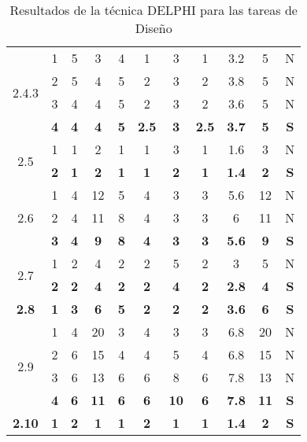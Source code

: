 \documentclass[11pt,a4paper,spanish,twoside]{report}
\begin{document}
\begin{table}[!h]
\begin{tabular}{|c|c||c|c|c|c|c||c|c|c||c|}
    \multirow{4}{*}{2.4.3}& 1 & 5 & 3 & 4 & 1 & 3 & 1 & 3.2 & 5 & N \\
    & 2 & 5 & 4 & 5 & 2 & 3 & 2 & 3.8 & 5 & N \\
    & 3 & 4 & 4 & 5 & 2 & 3 & 2 & 3.6 & 5 & N \\
    & \textbf{4} & \textbf{4} & \textbf{4} & \textbf{5} & \textbf{2.5} & \textbf{3} & \textbf{2.5} & \textbf{3.7} & \textbf{5} & \textbf{S} \\
    \hline

    \multirow{2}{*}{2.5}& 1 & 1 & 2 & 1 & 1 & 3 & 1 & 1.6 & 3 & N \\
    & \textbf{2} & \textbf{1} & \textbf{2} & \textbf{1} & \textbf{1} & \textbf{2} & \textbf{1} & \textbf{1.4} & \textbf{2} & \textbf{S} \\
    \hline

    \multirow{3}{*}{2.6}& 1 & 4 & 12 & 5 & 4 & 3 & 3 & 5.6 & 12 & N \\
    & 2 & 4 & 11 & 8 & 4 & 3 & 3 & 6 & 11 & N \\
    & \textbf{3} & \textbf{4} & \textbf{9} & \textbf{8} & \textbf{4} & \textbf{3} & \textbf{3} & \textbf{5.6} & \textbf{9} & \textbf{S} \\
    \hline

    \multirow{2}{*}{2.7}& 1 & 2 & 4 & 2 & 2 & 5 & 2 & 3 & 5 & N \\
    & \textbf{2} & \textbf{2} & \textbf{4} & \textbf{2} & \textbf{2} & \textbf{4} & \textbf{2} & \textbf{2.8} & \textbf{4} & \textbf{S} \\
    \hline

    \textbf{2.8} & \textbf{1} & \textbf{3} & \textbf{6} & \textbf{5} & \textbf{2} & \textbf{2} & \textbf{2} & \textbf{3.6} & \textbf{6} & \textbf{S} \\
    \hline

    \multirow{4}{*}{2.9}& 1 & 4 & 20 & 3 & 4 & 3 & 3 & 6.8 & 20 & N \\
    & 2 & 6 & 15 & 4 & 4 & 5 & 4 & 6.8 & 15 & N \\
    & 3 & 6 & 13 & 6 & 6 & 8 & 6 & 7.8 & 13 & N \\
    & \textbf{4} & \textbf{6} & \textbf{11} & \textbf{6} & \textbf{6} & \textbf{10} & \textbf{6} & \textbf{7.8} & \textbf{11} & \textbf{S} \\
    \hline

    \textbf{2.10} & \textbf{1} & \textbf{2} & \textbf{1} & \textbf{1} & \textbf{2} & \textbf{1} & \textbf{1} & \textbf{1.4} & \textbf{2} & \textbf{S} \\
    \hline
  \end{tabular}
  \caption{Resultados de la técnica DELPHI para las tareas de
    Diseño} \label{Tab:dis}
\end{table}
\end{document}
